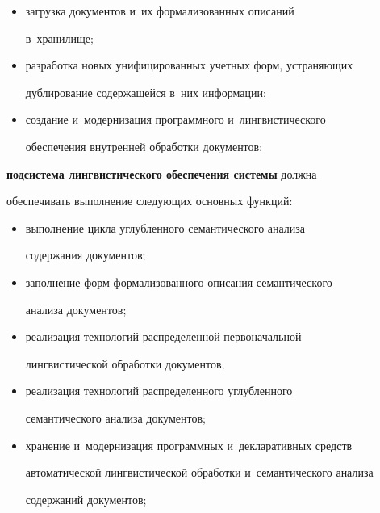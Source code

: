 \begin{description}
\begin{itemize}
лингвистической обработки содержания документов;


     \item загрузка документов и~их формализованных описаний 


в~хранилище; 


     \item разработка новых унифицированных учетных форм, устраняющих 


дуб\-ли\-ро\-ва\-ние содержащейся в~них информации;


     \item создание и~модернизация программного и~лингвистического 


обеспечения внутренней обработки документов;


     \end{itemize}


     


     \item[\,] \textbf{подсистема лингвистического обеспечения системы} должна 


обеспечивать выполнение следующих основных функций:


     \begin{itemize}


     \item  выполнение цикла углубленного семантического анализа 


содержания документов;


     \item  заполнение форм формализованного описания семантического 


анализа документов; 


     \item реализация технологий распределенной первоначальной 


лингвистической обработки документов;


     \item реализация технологий распределенного углубленного 


семантического анализа документов;


     \item хранение и~модернизация программных и~декларативных средств 


автоматической лингвистической обработки и~семантического анализа 


содержаний документов;


     \end{itemize}



\end{description}
